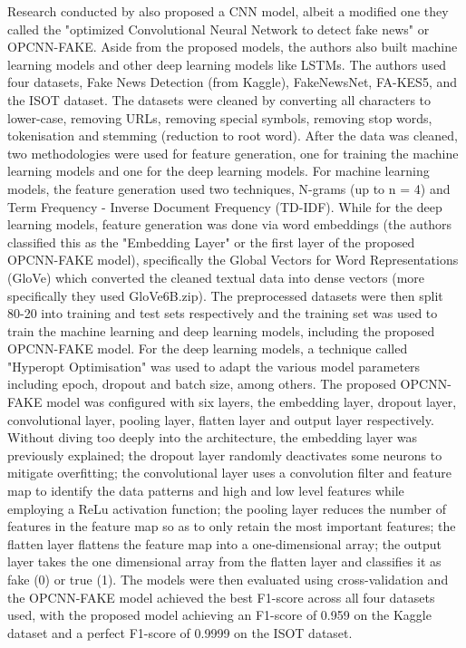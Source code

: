 \documentclass[stu,12pt,floatsintext,donotrepeattitle]{apa7}
\begin{document}
Research conducted by \textcite{opcnn-fake} also proposed a CNN model, albeit a modified one they called the "optimized Convolutional Neural Network to detect fake news" or OPCNN-FAKE. Aside from the proposed models, the authors also built machine learning models and other deep learning models like LSTMs. The authors used four datasets, Fake News Detection (from Kaggle), FakeNewsNet, FA-KES5, and the ISOT dataset. The datasets were cleaned by converting all characters to lower-case, removing URLs, removing special symbols, removing stop words, tokenisation and stemming (reduction to root word). After the data was cleaned, two methodologies were used for feature generation, one for training the machine learning models and one for the deep learning models. For machine learning models, the feature generation used two techniques, N-grams (up to n = 4) and Term Frequency - Inverse Document Frequency (TD-IDF). While for the deep learning models, feature generation was done via word embeddings (the authors classified this as the "Embedding Layer" or the first layer of the proposed OPCNN-FAKE model), specifically the Global Vectors for Word Representations (GloVe) which converted the cleaned textual data into dense vectors (more specifically they used GloVe6B.zip). The preprocessed datasets were then split 80-20 into training and test sets respectively and the training set was used to train the machine learning and deep learning models, including the proposed OPCNN-FAKE model. For the deep learning models, a technique called "Hyperopt Optimisation" was used to adapt the various model parameters including epoch, dropout and batch size, among others. The proposed OPCNN-FAKE model was configured with six layers, the embedding layer, dropout layer, convolutional layer, pooling layer, flatten layer and output layer respectively. Without diving too deeply into the architecture, the embedding layer was previously explained; the dropout layer randomly deactivates some neurons to mitigate overfitting; the convolutional layer uses a convolution filter and feature map to identify the data patterns and high and low level features while employing a ReLu activation function; the pooling layer reduces the number of features in the feature map so as to only retain the most important features; the flatten layer flattens the feature map into a one-dimensional array; the output layer takes the one dimensional array from the flatten layer and classifies it as fake (0) or true (1). The models were then evaluated using cross-validation and the OPCNN-FAKE model achieved the best F1-score across all four datasets used, with the proposed model achieving an F1-score of 0.959 on the Kaggle dataset and a perfect F1-score of 0.9999 on the ISOT dataset.
\end{document}
